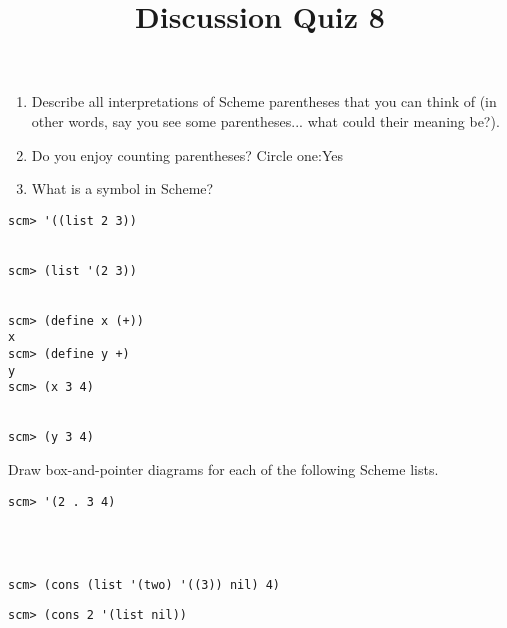 \documentclass[twoside]{article}
\title{\sc Discussion Quiz 8}
\begin{document}
\thispagestyle{empty}
\maketitle

\begin{enumerate}

\begin{enumerate}
\item Describe all interpretations of Scheme parentheses that you can think of (in other words, say you see some parentheses... what could their meaning be?).

\vspace{0.5in}

\item Do you enjoy counting parentheses? Circle one:\:\:Yes

\vspace{0.02in}

\item What is a symbol in Scheme?

\vspace{0.5in}

\end{enumerate}


\begin{lstlisting}
scm> '((list 2 3))


scm> (list '(2 3))


scm> (define x (+))
x
scm> (define y +)
y
scm> (x 3 4)


scm> (y 3 4)
\end{lstlisting}

\vspace{0.3in}


Draw box-and-pointer diagrams for each of the following Scheme lists.

\begin{lstlisting}
scm> '(2 . 3 4)




scm> (cons (list '(two) '((3)) nil) 4)
\end{lstlisting}

\newpage

\begin{lstlisting}
scm> (cons 2 '(list nil))





\end{lstlisting}
\end{enumerate}
\end{document}
